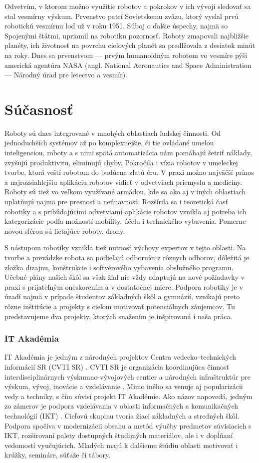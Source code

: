 Odvetvím, v ktorom možno využitie robotov a pokrokov v ich vývoji sledovať sa stal vesmírny výskum. Prvenstvo patrí Sovietskemu zväzu, ktorý vyslal prvú robotickú vesmírnu loď už v roku 1951. Súboj o ďalšie úspechy, najmä so Spojenými štátmi, upriamil na robotiku pozornosť. Roboty zmapovali najbližšie planéty, ich životnosť na povrchu cieľových planét sa predlžovala z desiatok minút na roky. Dnes sa prvenstvom --- prvým humanoidným robotom vo vesmíre pýši americká agentúra NASA (angl. National Aeronautics and Space Administration --- Národný úrad pre letectvo a vesmír).


\section{Súčasnosť}
Roboty sú dnes integrované v mnohých oblastiach ľudskej činnosti. Od jednoduchších systémov až po komplexnejšie, či tie ovládané umelou inteligenciou, roboty a s nimi spätá automatizácia nám pomáhajú šetriť náklady, zvyšujú produktivitu, eliminujú chyby. Pokročila i vízia robotov v umeleckej tvorbe, ktorá veští robotom do budúcna zlatú éru. V praxi možno najväčší prínos a najrozsiahlejšiu aplikáciu robotov vidieť v odvetviach priemyslu a medicíny. Roboty sú tiež vo veľkom využívané armádou, kde sa ako aj v iných oblastiach uplatňujú najmä pre presnosť a neúnavnosť. Rozšírila sa i teoretická časť robotiky a s pribúdajúcimi odvetviami aplikácie robotov vznikla aj potreba ich kategorizácie podľa možností mobility, účelu i technického vybavenia. Pomerne novou sférou sú lietajúce roboty, drony.

S nástupom robotiky vznikla tiež nutnosť výchovy expertov v tejto oblasti. Na tvorbe a prevádzke robota sa podieľajú odborníci z rôznych odborov, dôležitá je zložka dizajnu, konštrukcie i softvérového vybavenia obslužného programu. Učebné plány našich škôl sa však žiaľ nie vždy adaptujú na nové požiadavky v praxi s prijateľným oneskorením a v dostatočnej miere. Podpora robotiky je v úzadí najmä v prípade študentov základných škôl a gymnázií, vznikajú preto rôzne inštitúcie a projekty s cieľom motivovať potenciálnych záujemcov. Tu predstavujeme dva projekty, ktorých snažením je inšpirovaná i naša práca.

\subsubsection*{IT Akadémia}
IT Akadémia je jedným z národných projektov Centra vedecko--technických informácií SR (CVTI SR) \cite{CVTISR-ITAkademia}. CVTI SR je organizácia koordinujúca činnosť interdisciplinárnych výskumno-vývojových centier a národných infraštruktúr pre výskum, vývoj, inovácie a vzdelávanie \cite{CVTISR}. Mimo iného sa venuje aj popularizácii vedy a techniky, s čím súvisí projekt IT Akadémie. Ako názov napovedá, jedným zo zámerov je podpora vzdelávania v oblasti informačných a komunikačných technológií (IKT) \cite{ITAkademia}. Cieľovú skupinu tvoria žiaci základných a stredných škôl. Podpora spočíva v modernizácii obsahu a metód výučby predmetov súvisiacich s IKT, rozširovaní palety dostupných študijných materiálov, ale i v dopĺňaní vedomostí vyučujúcich. Mladých majú k ďalšiemu štúdiu oblasti motivovať i krúžky, semináre, súťaže či tábory.

